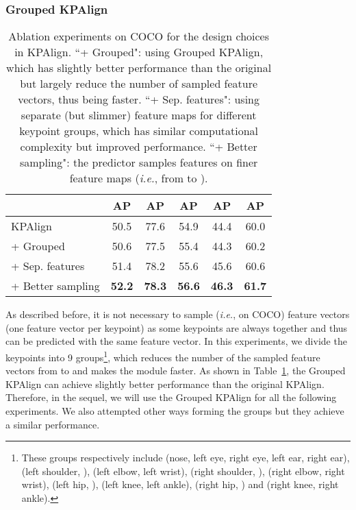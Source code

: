 \documentclass[10pt,twocolumn,letterpaper]{article}
\renewcommand{\texttt}[1]{}
\def\ie{{\it i.e.}\xspace}
\newcommand{\1}{{\mathbbm{1}}}
\begin{document}
{\subsubsection{Grouped KPAlign}
\begin{table}
	\small
	\begin{center}
	\begin{tabular}{ l | c c c c c}
		\hline
		& AP & AP & AP & AP & AP \\
		\hline\hline
		KPAlign & 50.5 & 77.6 & 54.9 & 44.4 & 60.0 \\
		+ Grouped & 50.6 & 77.5 & 55.4 & 44.3 & 60.2 \\
		+ Sep. features & 51.4 & 78.2 & 55.6 & 45.6 & 60.6  \\
		+ Better sampling & \textbf{52.2} & \textbf{78.3} & \textbf{56.6} & \textbf{46.3} & \textbf{61.7} \\
		\hline
	\end{tabular}
	\end{center}
	\caption{Ablation experiments on COCO \texttt{minival} for the design choices in KPAlign. ``+ Grouped": using Grouped KPAlign, which has slightly better performance than the original but largely reduce the number of sampled feature vectors, thus being faster. ``+ Sep. features": using separate (but slimmer) feature maps for different keypoint groups, which has similar computational complexity but improved performance. ``+ Better sampling": the predictor samples features on finer feature maps (\ie, from  to ).}
	\label{table:better_kp_align}
\end{table}
As described before, it is not necessary to sample  (\ie,  on COCO) feature vectors (one feature vector per keypoint) as some keypoints are always together and thus can be predicted with the same feature vector. In this experiments, we divide the keypoints into 9 groups\footnote{These groups respectively include (nose, left eye, right eye, left ear, right ear), (left shoulder, ), (left elbow, left wrist), (right shoulder, ), (right elbow, right wrist), (left hip, ), (left knee, left ankle), (right hip, ) and (right knee, right ankle).}, which reduces the number of the sampled feature vectors from  to  and makes the module faster. As shown in Table~\ref{table:better_kp_align}, the Grouped KPAlign can achieve slightly better performance than the original KPAlign. Therefore, in the sequel, we will use the Grouped KPAlign for all the following experiments. We also attempted other ways forming the groups but they achieve a similar performance.

}
\end{document}
